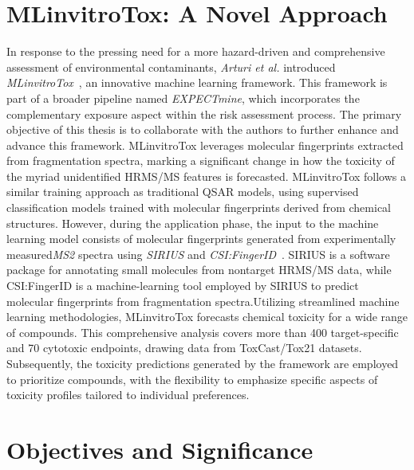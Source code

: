 \section{MLinvitroTox: A Novel Approach}

In response to the pressing need for a more hazard-driven and comprehensive assessment of environmental contaminants, \emph{Arturi et al.} introduced \emph{MLinvitroTox}~\cite{arturi}, an innovative machine learning framework. This framework is part of a broader pipeline named \emph{EXPECTmine}, which incorporates the complementary exposure aspect within the risk assessment process. The primary objective of this thesis is to collaborate with the authors to further enhance and advance this framework. MLinvitroTox leverages molecular fingerprints extracted from fragmentation spectra, marking a significant change in how the toxicity of the myriad unidentified HRMS/MS features is forecasted. MLinvitroTox follows a similar training approach as traditional QSAR models, using supervised classification models trained with molecular fingerprints derived from chemical structures. However, during the application phase, the input to the machine learning model consists of molecular fingerprints generated from experimentally measured\emph{MS2} spectra using \emph{SIRIUS} and \emph{CSI:FingerID}~\cite{sirius2019}. SIRIUS is a software package for annotating small molecules from nontarget HRMS/MS data, while CSI:FingerID is a machine-learning tool employed by SIRIUS to predict molecular fingerprints from fragmentation spectra.Utilizing streamlined machine learning methodologies, MLinvitroTox forecasts chemical toxicity for a wide range of compounds. This comprehensive analysis covers more than 400 target-specific and 70 cytotoxic endpoints, drawing data from ToxCast/Tox21 datasets. Subsequently, the toxicity predictions generated by the framework are employed to prioritize compounds, with the flexibility to emphasize specific aspects of toxicity profiles tailored to individual preferences.

\section{Objectives and Significance}

